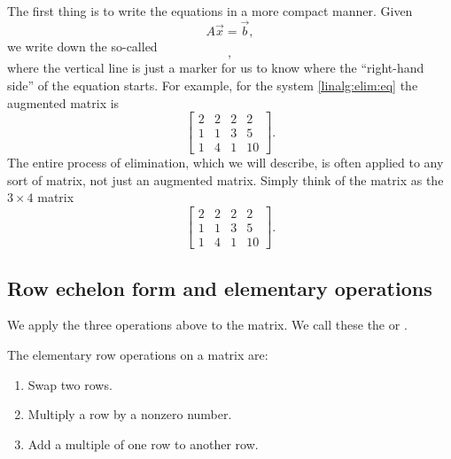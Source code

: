 \documentclass{ximera}
\begin{document}
The first thing is to write the equations in a more compact manner.  Given
\begin{equation*}
    A \vec{x} = \vec{b} ,
\end{equation*}
we write down the so-called \emph{}
\begin{equation*}
    [ A ~|~ \vec{b} ] ,
\end{equation*}
where the vertical line is just a marker for us to know where the ``right-hand side'' of the equation starts.  For example, for the system \eqref{linalg:elim:eq} the augmented matrix is
\begin{equation*}
    \left[
        \begin{array}{ccc|c}
            2 & 2 & 2 & 2 \\
            1 & 1 & 3 & 5 \\
            1 & 4 & 1 & 10
        \end{array}
    \right] .
\end{equation*}
The entire process of elimination, which we will describe, is often applied to any sort of matrix, not just an augmented matrix. Simply think of the matrix as the $3 \times 4$ matrix
\begin{equation*}
    \begin{bmatrix}
        2 & 2 & 2 & 2 \\
        1 & 1 & 3 & 5 \\
        1 & 4 & 1 & 10
    \end{bmatrix} .
\end{equation*}

\subsection{Row echelon form and elementary operations}

We apply the three operations above to the matrix. We call these the \emph{} or \emph{}.
\begin{definition}
    The elementary row operations on a matrix are:
    \begin{enumerate}
        \item Swap two rows.
        \item Multiply a row by a nonzero number.
        \item Add a multiple of one row to another row.
    \end{enumerate}
\end{definition}
\end{document}

